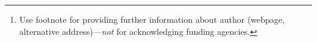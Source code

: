 \documentclass{article}
\begin{document}
\author{%
  Single Author\thanks{Use footnote for providing further information
    about author (webpage, alternative address)---\emph{not} for acknowledging
    funding agencies.} \\
  Department of Music\\
  Strawberry-Raspberry University\\
  Pittsburgh, PA 15213 \\
  \texttt{rhino@music.strawberry-raspberry.edu} \\
}
\end{document}
